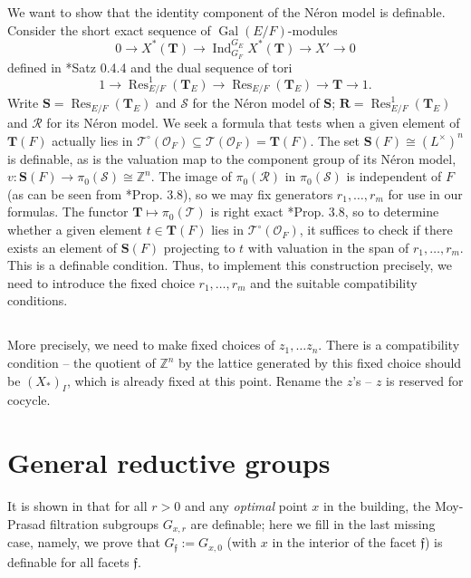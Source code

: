 \documentclass{amsart}
\newcommand{\Z}{{\mathbb Z}}
\newcommand{\ri}{\mathcal{O}}
\newcommand{\bT}{\mathbf {T}}
\newcommand{\bS}{\mathbf{S}}
\newcommand{\bR}{\mathbf{R}}
\newcommand{\ff}{{\mathfrak f}}
\newcommand{\Ner}[1]{\mathcal{#1}}
\newcommand{\NerC}[1]{\mathcal{#1}^\circ}
\DeclareMathOperator{\Gal}{Gal}
\DeclareMathOperator{\Ind}{Ind}
\DeclareMathOperator{\Res}{Res}
\theoremstyle{plain}
\theoremstyle{definition}
\begin{document}
We want to show that the identity component of the N\'eron model is definable.  Consider the short exact sequence of $\Gal(E/F)$-modules
\[
0 \to X^*(\bT) \to \Ind_{G_F}^{G_E} X^*(\bT) \to X' \to 0
\]
defined in \cite{brahm}*{Satz 0.4.4} and the dual sequence of tori
\[
1 \to \Res_{E/F}^1(\bT_E) \to \Res_{E/F} (\bT_E) \to \bT \to 1.
\]
Write $\bS = \Res_{E/F} (\bT_E)$ and $\Ner{S}$ for the N\'eron model of $\bS$; $\bR = \Res_{E/F}^1 (\bT_E)$ and $\Ner{R}$ for its N\'eron model. 
We seek a formula that tests when a given element of $\bT(F)$ actually lies in $\NerC{T}(\ri_F) \subseteq \Ner{T}(\ri_F) = \bT(F)$. The set $\bS(F) \cong (L^\times)^n$ is definable, as is the valuation map to the component group of its N\'eron model, $v : \bS(F) \to \pi_0(\Ner{S}) \cong \Z^n$.  The image of $\pi_0(\Ner{R})$ in $\pi_0(\Ner{S})$ is independent of $F$ (as can be seen from \cite{bertrapelle-gonzales:13b}*{Prop. 3.8}), so we may fix generators $r_1, \ldots, r_m$ for use in our formulas.  The functor $\bT \mapsto \pi_0(\Ner{T})$ is right exact \cite{bertrapelle-gonzales:13b}*{Prop. 3.8}, so to determine whether a given element $t \in \bT(F)$ lies in $\NerC{T}(\ri_F)$, it suffices to check if there exists an element of $\bS(F)$ projecting to $t$ with valuation in the span of $r_1, \ldots, r_m$.  This is a definable condition.
Thus, to implement this construction precisely, we need to introduce the fixed choice 
$r_1, \dots, r_m$ and the suitable compatibility conditions. 


\subsection{}More precisely, we need to make fixed choices of $z_1, \dots z_n$. 
There is a compatibility condition -- the quotient of $\Z^n$ by the lattice generated by this fixed choice should be $(X_\ast)_I$, which is already fixed at this point. 
Rename the $z$'s -- $z$ is reserved for cocycle.  

\section{General reductive groups}
It is shown in \cite{CGH-2} that for all $r>0$ and any \emph{optimal} point $x$ in the building, the Moy-Prasad filtration subgroups $G_{x, r}$ are definable; here we fill in the last missing case, namely, we prove that $G_{\ff}:=G_{x, 0}$ (with $x$ in the interior of the facet $\ff$)   is definable for  all facets $\ff$.  
\end{document}
